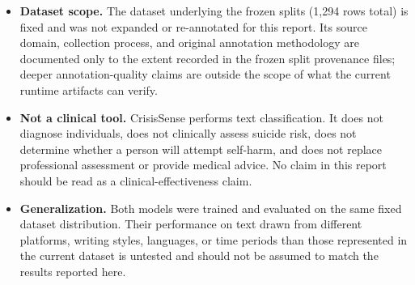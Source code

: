 \begin{itemize}[nosep,leftmargin=*]
  \item \textbf{Dataset scope.} The dataset underlying the frozen splits (1{,}294 rows total) is fixed and was not expanded or re-annotated for this report. Its source domain, collection process, and original annotation methodology are documented only to the extent recorded in the frozen split provenance files; deeper annotation-quality claims are outside the scope of what the current runtime artifacts can verify.

  \item \textbf{Not a clinical tool.} CrisisSense performs text classification. It does not diagnose individuals, does not clinically assess suicide risk, does not determine whether a person will attempt self-harm, and does not replace professional assessment or provide medical advice. No claim in this report should be read as a clinical-effectiveness claim.

  \item \textbf{Generalization.} Both models were trained and evaluated on the same fixed dataset distribution. Their performance on text drawn from different platforms, writing styles, languages, or time periods than those represented in the current dataset is untested and should not be assumed to match the results reported here.
\end{itemize}
